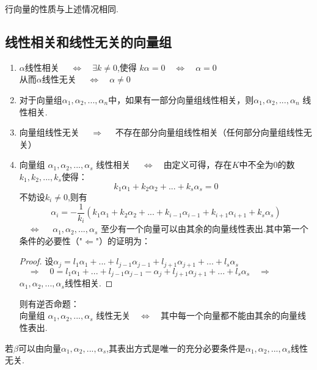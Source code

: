 \documentclass[blue,normal,cn]{elegantnote}
\begin{document}
行向量的性质与上述情况相同.

\subsection{线性相关和线性无关的向量组}
\begin{enumerate}[(1)]
    \item $α$线性相关 $\quad \Longleftrightarrow \quad \exists k≠0$,使得 $kα=0 \quad \Longleftrightarrow \quad α=0$\\从而$α$线性无关  $\quad \Longleftrightarrow \quad  α ≠ 0$
    \item 对于向量组$α_1,α_2,...,α_n$中，如果有一部分向量组线性相关，则$α_1,α_2,...,α_n$ 线性相关.
    \item 向量组线性无关   $\quad \Longrightarrow \quad$ 不存在部分向量组线性相关（任何部分向量组线性无关）
    \item 向量组 $α_1,α_2,...,α_s$ 线性相关 $\quad \Longleftrightarrow \quad$由定义可得，存在$K$中不全为$0$的数$k_1,k_2,...,k_s$使得：
        \begin{equation*}
            k_1α_1+k_2α_2+...+k_sα_s=0
        \end{equation*}
        不妨设$k_i≠ 0$,则有
        \begin{equation*}
            α_i=-\frac{1}{k_i}(k_1α_1+k_2α_2+...+k_{i-1}α_{i-1}+k_{i+1}α_{i+1}+k_sα_s)
        \end{equation*}
        $\quad \Longleftrightarrow \quad$ $α_1,α_2,...,α_s$ 至少有一个向量可以由其余的向量线性表出.其中第一个条件的必要性（"$\Leftarrow$"）的证明为：
        \begin{proof}
            设$α_j=l_1α_1+...+l_{j-1} α_{j-1}+l_{j+1} α_{j+1}+...+l_s α_s$\\
            $\quad \Longrightarrow \quad 0=l_1α_1+...+l_{j-1} α_{j-1}-α_j+l_{j+1} α_{j+1}+...+l_s α_s   \quad \Longrightarrow \quad $
            $α_1,α_2,...,α_s$线性相关.
        \end{proof}
        则有逆否命题：
        \\向量组 $α_1,α_2,...,α_s$ 线性无关$\quad \Longleftrightarrow \quad$其中每一个向量都不能由其余的向量线性表出.
\end{enumerate}


\begin{proposition}
    \label{linear_show_only}
若$β$可以由向量$α_1,α_2,...,α_s$,其表出方式是唯一的充分必要条件是$α_1,α_2,...,α_s$线性无关.
\end{proposition}
\end{document}

